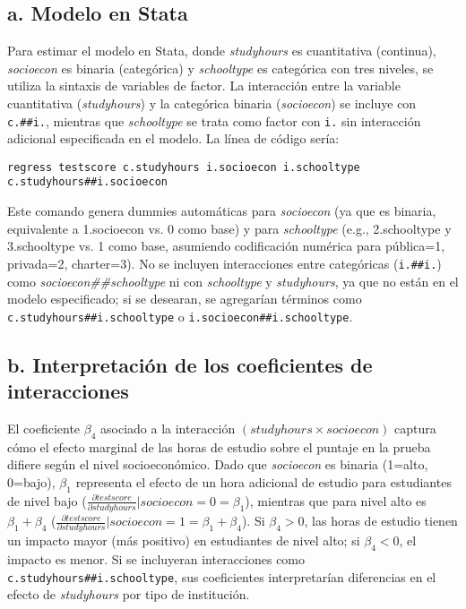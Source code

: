 \documentclass[12pt]{article}
\begin{document}
\subsection*{a. Modelo en Stata}

Para estimar el modelo en Stata, donde \textit{studyhours} es cuantitativa (continua), \textit{socioecon} es binaria (categórica) y \textit{schooltype} es categórica con tres niveles, se utiliza la sintaxis de variables de factor. La interacción entre la variable cuantitativa (\textit{studyhours}) y la categórica binaria (\textit{socioecon}) se incluye con \texttt{c.\#\#i.}, mientras que \textit{schooltype} se trata como factor con \texttt{i.} sin interacción adicional especificada en el modelo. La línea de código sería:

\begin{verbatim}
regress testscore c.studyhours i.socioecon i.schooltype c.studyhours##i.socioecon
\end{verbatim}

Este comando genera dummies automáticas para \textit{socioecon} (ya que es binaria, equivalente a 1.socioecon vs. 0 como base) y para \textit{schooltype} (e.g., 2.schooltype y 3.schooltype vs. 1 como base, asumiendo codificación numérica para pública=1, privada=2, charter=3). No se incluyen interacciones entre categóricas (\texttt{i.\#\#i.}) como \textit{socioecon\#\#schooltype} ni con \textit{schooltype} y \textit{studyhours}, ya que no están en el modelo especificado; si se desearan, se agregarían términos como \texttt{c.studyhours\#\#i.schooltype} o \texttt{i.socioecon\#\#i.schooltype}.

\subsection*{b. Interpretación de los coeficientes de interacciones}

El coeficiente \(\beta_4\) asociado a la interacción \((studyhours \times socioecon)\) captura cómo el efecto marginal de las horas de estudio sobre el puntaje en la prueba difiere según el nivel socioeconómico. Dado que \textit{socioecon} es binaria (1=alto, 0=bajo), \(\beta_1\) representa el efecto de un hora adicional de estudio para estudiantes de nivel bajo (\( \frac{\partial testscore}{\partial studyhours} | socioecon=0 = \beta_1 \)), mientras que para nivel alto es \(\beta_1 + \beta_4\) (\( \frac{\partial testscore}{\partial studyhours} | socioecon=1 = \beta_1 + \beta_4 \)). Si \(\beta_4 > 0\), las horas de estudio tienen un impacto mayor (más positivo) en estudiantes de nivel alto; si \(\beta_4 < 0\), el impacto es menor. Si se incluyeran interacciones como \texttt{c.studyhours\#\#i.schooltype}, sus coeficientes interpretarían diferencias en el efecto de \textit{studyhours} por tipo de institución.
\end{document}
